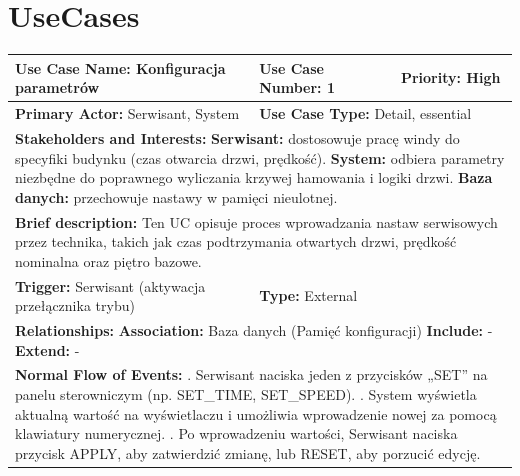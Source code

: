 \documentclass[12pt,a4paper]{article}
\begin{document}
\section*{UseCases}

\begin{table}[h!]
\centering
\begin{tabular}{|p{}|p{}|p{}|}
\hline
\textbf{Use Case Name:} Konfiguracja parametrów & \textbf{Use Case Number:} 1 & \textbf{Priority:} High \\ \hline
\textbf{Primary Actor:} Serwisant, System & \multicolumn{2}{l|}{\textbf{Use Case Type:} Detail, essential} \\ \hline
\multicolumn{3}{|p{0.9\textwidth}|}{\textbf{Stakeholders and Interests:} \newline
\textbf{Serwisant:} dostosowuje pracę windy do specyfiki budynku (czas otwarcia drzwi, prędkość). \newline
\textbf{System:} odbiera parametry niezbędne do poprawnego wyliczania krzywej hamowania i logiki drzwi. \newline
\textbf{Baza danych:} przechowuje nastawy w pamięci nieulotnej.} \\ \hline
\multicolumn{3}{|p{0.9\textwidth}|}{\textbf{Brief description:} Ten UC opisuje proces wprowadzania nastaw serwisowych przez technika, takich jak czas podtrzymania otwartych drzwi, prędkość nominalna oraz piętro bazowe.} \\ \hline
\textbf{Trigger:} Serwisant (aktywacja przełącznika trybu) & \multicolumn{2}{l|}{\textbf{Type:} External} \\ \hline
\multicolumn{3}{|p{0.9\textwidth}|}{\textbf{Relationships:} \newline
\textbf{Association:} Baza danych (Pamięć konfiguracji) \newline
\textbf{Include:} - \newline
\textbf{Extend:} -} \\ \hline
\multicolumn{3}{|p{0.9\textwidth}|}{\textbf{Normal Flow of Events:} \newline
1. Serwisant naciska jeden z przycisków „SET” na panelu sterowniczym (np. SET\_TIME, SET\_SPEED).  \newline
2. System wyświetla aktualną wartość na wyświetlaczu i umożliwia wprowadzenie nowej za pomocą klawiatury numerycznej. \newline
3. Po wprowadzeniu wartości, Serwisant naciska przycisk APPLY, aby zatwierdzić zmianę, lub RESET, aby porzucić edycję. \newline
}
\end{tabular}
\end{table}
\end{document}
